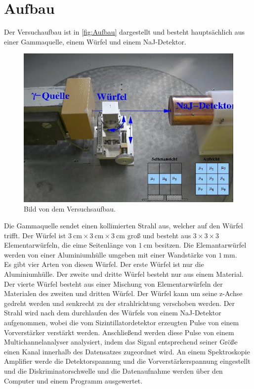 \section{Aufbau}
\label{sec:Aufbau}
Der Versuchaufbau ist in \autoref{fig:Aufbau} dargestellt und besteht hauptsächlich aus einer Gammaquelle, einem Würfel und einem NaJ-Detektor.
\begin{figure}[H]
    \centering
    \includegraphics[scale=0.7]{Abbildungen/Aufbau.png}
    \caption{Bild von dem Versuchsaufbau.\cite{V14}}
    \label{fig:Doppelbrechung}
\end{figure}
Die Gammaquelle sendet einen kollimierten Strahl aus, welcher auf den Würfel trifft. 
Der Würfel ist $\qty{3}{\centi\meter} \times \qty{3}{\centi\meter} \times \qty{3}{\centi\meter}$ groß und besteht aus $3 \times 3 \times 3$ Elementarwürfeln, die eime Seitenlänge
von $\qty{1}{\centi\meter}$ besitzen. Die Elemantarwürfel werden von einer Aluminiumhülle umgeben mit einer Wandstärke von $\qty{1}{\milli\meter}$.\\
Es gibt vier Arten von diesen Würfel. Der erste Würfel ist nur die Aluminiumhülle. Der zweite und dritte Würfel besteht nur aus einem Material. Der vierte Würfel besteht aus
einer Mischung von Elementarwürfeln der Materialen des zweiten und dritten Würfel.
Der Würfel kann um seine z-Achse gedreht werden und senkrecht zu der strahlrichtung verschoben werden.
Der Strahl wird nach dem durchlaufen des Würfels von einem NaJ-Detektor aufgenommen, wobei die vom Sizintillatordetektor erzeugten Pulse von einem Vorverstärker verstärkt werden.
Anschließend werden diese Pulse von einem Multichannelanalyser analysiert, indem das Siganl entsprechend seiner Größe einen Kanal innerhalb des Datensatzes zugeordnet wird.
An einem Spektroskopie Amplifier werde die Detektorspannung und die Vorverstärkerspannung eingestellt und die Diskriminatorschwelle und die Datenaufnahme werden über den Computer und einem 
Programm ausgewertet.


